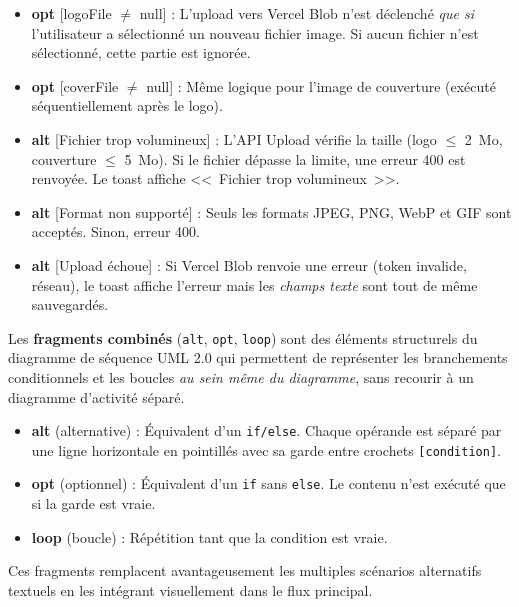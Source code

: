 \documentclass[12pt,a4paper]{article}
\begin{document}
\begin{itemize}
    \item \textbf{opt} [logoFile $\neq$ null] : L'upload vers Vercel Blob n'est déclenché \textit{que si} l'utilisateur a sélectionné un nouveau fichier image. Si aucun fichier n'est sélectionné, cette partie est ignorée.
    \item \textbf{opt} [coverFile $\neq$ null] : Même logique pour l'image de couverture (exécuté séquentiellement après le logo).
    \item \textbf{alt} [Fichier trop volumineux] : L'API Upload vérifie la taille (logo $\leq$ 2~Mo, couverture $\leq$ 5~Mo). Si le fichier dépasse la limite, une erreur 400 est renvoyée. Le toast affiche <<~Fichier trop volumineux~>>.
    \item \textbf{alt} [Format non supporté] : Seuls les formats JPEG, PNG, WebP et GIF sont acceptés. Sinon, erreur 400.
    \item \textbf{alt} [Upload échoue] : Si Vercel Blob renvoie une erreur (token invalide, réseau), le toast affiche l'erreur mais les \textit{champs texte} sont tout de même sauvegardés.
\end{itemize}

\begin{tcolorbox}[colback=blue!3!white,colframe=blue!50!black,title=Note méthodologique — Fragments combinés (Audibert)]
\small
Les \textbf{fragments combinés} (\texttt{alt}, \texttt{opt}, \texttt{loop}) sont des éléments structurels du diagramme de séquence UML 2.0 qui permettent de représenter les branchements conditionnels et les boucles \textit{au sein même du diagramme}, sans recourir à un diagramme d'activité séparé.

\begin{itemize}
    \item \textbf{alt} (alternative) : Équivalent d'un \texttt{if/else}. Chaque opérande est séparé par une ligne horizontale en pointillés avec sa garde entre crochets \texttt{[condition]}.
    \item \textbf{opt} (optionnel) : Équivalent d'un \texttt{if} sans \texttt{else}. Le contenu n'est exécuté que si la garde est vraie.
    \item \textbf{loop} (boucle) : Répétition tant que la condition est vraie.
\end{itemize}
Ces fragments remplacent avantageusement les multiples scénarios alternatifs textuels en les intégrant visuellement dans le flux principal.
\end{tcolorbox}
\end{document}
